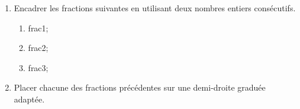\documentclass[exercice]{thedocument}%
\begin{document}
%
\begin{enumerate}
    \item Encadrer les fractions suivantes en utilisant deux nombres entiers
    consécutifs.
    \begin{enumerate}
        \item \<frac1;
        \item \<frac2;
        \item \<frac3;
    \end{enumerate}
    \item Placer chacune des fractions précédentes sur une demi-droite graduée
    adaptée.
\end{enumerate}
\end{document}
